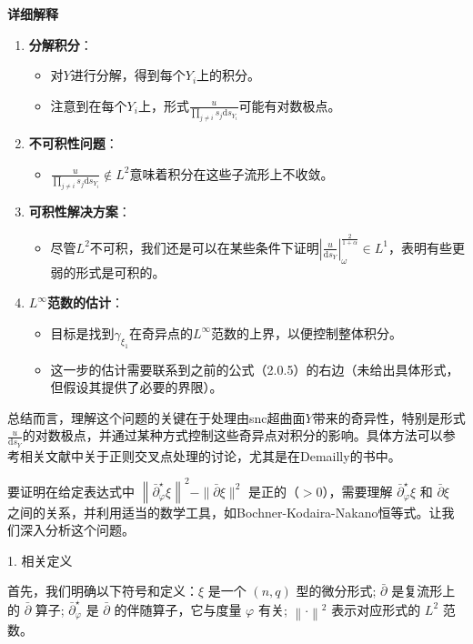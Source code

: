 \begin{solution}
\textbf{详细解释}
\begin{enumerate}
    \item \textbf{分解积分}：
    \begin{itemize}
        \item 对$Y$进行分解，得到每个$Y_i$上的积分。
        \item 注意到在每个$Y_i$上，形式$\frac{u}{\prod_{j \neq i} s_j \mathrm{d} s_{Y_i}}$可能有对数极点。
    \end{itemize}
    \item \textbf{不可积性问题}：
    \begin{itemize}
        \item $\frac{u}{\prod_{j \neq i} s_j \mathrm{d} s_{Y_i}} \notin L^2$意味着积分在这些子流形上不收敛。
    \end{itemize}
    \item \textbf{可积性解决方案}：
    \begin{itemize}
        \item 尽管$L^2$不可积，我们还是可以在某些条件下证明$\left|\frac{u}{\mathrm{d} s_Y}\right|_\omega^{\frac{2}{1+\alpha}} \in L^1$，表明有些更弱的形式是可积的。
    \end{itemize}
    \item \textbf{$L^{\infty}$范数的估计}：
    \begin{itemize}
        \item 目标是找到$\gamma_{\xi_1}$在奇异点的$L^{\infty}$范数的上界，以便控制整体积分。
        \item 这一步的估计需要联系到之前的公式（2.0.5）的右边（未给出具体形式，但假设其提供了必要的界限）。
    \end{itemize}
\end{enumerate}

总结而言，理解这个问题的关键在于处理由snc超曲面$Y$带来的奇异性，特别是形式$\frac{u}{\mathrm{d} s_Y}$的对数极点，并通过某种方式控制这些奇异点对积分的影响。具体方法可以参考相关文献中关于正则交叉点处理的讨论，尤其是在Demailly的书中。

\end{solution}


要证明在给定表达式中 $\left\|\bar{\partial}_{\varphi}^{\star} \xi\right\|^2 - \|\bar{\partial} \xi\|^2$ 是正的（$>0$），需要理解 $\bar{\partial}_{\varphi}^{\star} \xi$ 和 $\bar{\partial} \xi$ 之间的关系，并利用适当的数学工具，如Bochner-Kodaira-Nakano恒等式。让我们深入分析这个问题。

1. 相关定义

首先，我们明确以下符号和定义：$\xi$ 是一个 $(n,q)$ 型的微分形式; 
$\bar{\partial}$ 是复流形上的 $\bar{\partial}$ 算子;
$\bar{\partial}_{\varphi}^{\star}$ 是 $\bar{\partial}$ 的伴随算子，它与度量 $\varphi$ 有关;
$\left\|\cdot\right\|^2$ 表示对应形式的 $L^2$ 范数。

